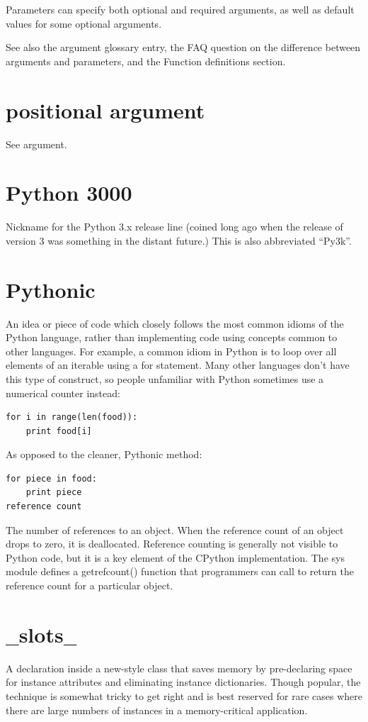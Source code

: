 \documentclass[12pt,a4paper,final,twoside,onecolumn,titlepage]{book}
\begin{document}
Parameters can specify both optional and required arguments, as well as default values for some optional arguments.

See also the argument glossary entry, the FAQ question on the difference between arguments and parameters, and the Function definitions section.

\section{positional argument}
See argument.

\section{Python 3000}
Nickname for the Python 3.x release line (coined long ago when the release of version 3 was something in the distant future.) This is also abbreviated “Py3k”.

\section{Pythonic}
An idea or piece of code which closely follows the most common idioms of the Python language, rather than implementing code using concepts common to other languages. For example, a common idiom in Python is to loop over all elements of an iterable using a for statement. Many other languages don’t have this type of construct, so people unfamiliar with Python sometimes use a numerical counter instead:
\begin{lstlisting}
for i in range(len(food)):
    print food[i]
\end{lstlisting}
As opposed to the cleaner, Pythonic method:
\begin{lstlisting}
for piece in food:
    print piece
reference count
\end{lstlisting}
The number of references to an object. When the reference count of an object drops to zero, it is deallocated. Reference counting is generally not visible to Python code, but it is a key element of the CPython implementation. The sys module defines a getrefcount() function that programmers can call to return the reference count for a particular object.
\section{$\_\_$slots$\_\_$}
A declaration inside a new-style class that saves memory by pre-declaring space for instance attributes and eliminating instance dictionaries. Though popular, the technique is somewhat tricky to get right and is best reserved for rare cases where there are large numbers of instances in a memory-critical application.
\end{document}
